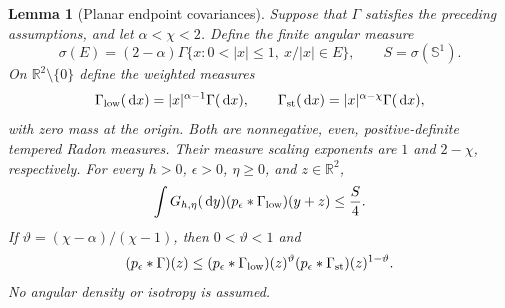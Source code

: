 \documentclass[12pt]{article}
\numberwithin{equation}{section}
\newtheorem{lemma}[theorem]{Lemma}
\theoremstyle{definition}
\newcommand{\R}{\mathbb{R}}
\newcommand{\ud}{\,\mathrm{d}}
\begin{document}
\begin{lemma}[Planar endpoint covariances]\label{L:planar-endpoints}
  Suppose that $\Gamma$ satisfies the preceding assumptions, and let
  $\alpha<\chi<2$. Define the finite angular measure
  \[
    \sigma(E)=(2-\alpha)\Gamma
    \{x:0<|x|\le1,\ x/|x|\in E\},\qquad
    S=\sigma(\mathbb{S}^1).
  \]
  On $\R^2\setminus\{0\}$ define the weighted measures
  \begin{equation}\label{E:planar-endpoints}
    \Gamma_{\rm low}(\ud x)=|x|^{\alpha-1}\Gamma(\ud x),\qquad
    \Gamma_{\rm st}(\ud x)=|x|^{\alpha-\chi}\Gamma(\ud x),
  \end{equation}
  with zero mass at the origin. Both are nonnegative, even,
  positive-definite tempered Radon measures. Their measure scaling
  exponents are $1$ and $2-\chi$, respectively. For every $h>0$,
  $\epsilon>0$, $\eta\ge0$, and $z\in\R^2$,
  \begin{equation}\label{E:planar-line-convolution}
    \int G_{h,\eta}(\ud y)(p_\epsilon*\Gamma_{\rm low})(y+z)
    \le\frac S4.
  \end{equation}
  If $\vartheta=(\chi-\alpha)/(\chi-1)$, then $0<\vartheta<1$ and
  \begin{equation}\label{E:planar-gaussian-holder}
    (p_\epsilon*\Gamma)(z)
    \le(p_\epsilon*\Gamma_{\rm low})(z)^\vartheta
    (p_\epsilon*\Gamma_{\rm st})(z)^{1-\vartheta}.
  \end{equation}
  No angular density or isotropy is assumed.
\end{lemma}
\end{document}
